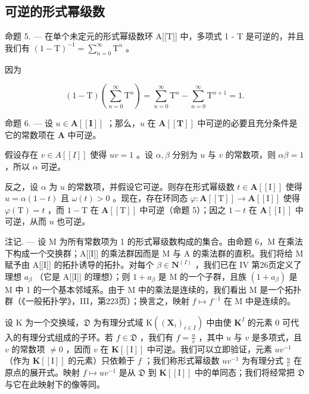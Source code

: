 \subsection{可逆的形式幂级数}

命题 5. --- 在单个未定元的形式幂级数环 A{[}{[}T{]}{]} 中，多项式 1 - T 是可逆的，并且我们有 \((1 - \mathrm{T})^{-1} = \sum_{n=0}^{\infty} \mathrm{T}^{n}\) 。

因为

\[
(1 - \mathrm{T}) \left(\sum_ {n = 0} ^ {\infty} \mathrm{T} ^ {n}\right) = \sum_ {n = 0} ^ {\infty} \mathrm{T} ^ {n} - \sum_ {n = 0} ^ {\infty} \mathrm{T} ^ {n + 1} = 1.
\]

命题 6. --- 设 \(u \in \mathbf{A}[[\mathbf{I}]]\) ；那么，\(u\) 在 \(\mathbf{A}[[\mathbf{T}]]\) 中可逆的必要且充分条件是它的常数项在 \(\mathbf{A}\) 中可逆。

假设存在 \(v \in A[[I]]\) 使得 \(uv = 1\) 。设 \(\alpha, \beta\) 分别为 \(u\) 与 \(v\) 的常数项，则 \(\alpha\beta = 1\) ，所以 \(\alpha\) 可逆。

反之，设 \(\alpha\) 为 \(u\) 的常数项，并假设它可逆。则存在形式幂级数 \(t \in \mathbf{A}[[\mathrm{I}]]\) 使得 \(u = \alpha(1 - t)\) 且 \(\omega(t) > 0\) 。现在，存在环同态 \(\varphi: \mathbf{A}[[\mathrm{T}]] \to \mathbf{A}[[\mathrm{I}]]\) 使得 \(\varphi(\mathrm{T}) = t\) ，而 \(1 - \mathrm{T}\) 在 \(\mathbf{A}[[\mathrm{T}]]\) 中可逆（命题 5）；因之 \(1 - t\) 在 \(\mathbf{A}[[\mathrm{I}]]\) 中可逆，从而 \(u\) 也可逆。

注记. --- 设 M 为所有常数项为 1 的形式幂级数构成的集合。由命题 6，M 在乘法下构成一个交换群；A{[}{[}I{]}{]} 的乘法群因而是 M 与 A 的乘法群的直积。我们将给 M 赋予由 A{[}{[}I{]}{]} 的拓扑诱导的拓扑。对每个 \(\beta \in \mathbf{N}^{(I)}\) ，我们已在 IV 第26页定义了理想 \(a_{\beta}\) （它是 A{[}{[}I{]}{]} 的理想）；则 \(1 + a_{\beta}\) 是 M 的一个子群，且族 \((1 + a_{\beta})\) 是 M 中 1 的一个基本邻域系。由于 M 中的乘法是连续的，我们看出 M 是一个拓扑群（《一般拓扑学》，III，第223页）；换言之，映射 \(f \mapsto f^{-1}\) 在 M 中是连续的。

设 K 为一个交换域，\(\mathfrak{D}\) 为有理分式域 \(\mathrm{K}((\mathbf{X}_i)_{i\in I})\) 中由使 \(\mathbf{K}^I\) 的元素 0 可代入的有理分式组成的子环。若 \(f\in \mathfrak{D}\) ，我们有 \(f = \frac{u}{v}\) ，其中 \(u\) 与 \(v\) 是多项式，且 \(v\) 的常数项 \(\neq 0\) ，因而 \(v\) 在 \(\mathbf{K}[[\mathrm{I}]]\) 中可逆。我们可以立即验证，元素 \(uv^{-1}\) （作为 \(\mathbf{K}[[\mathrm{I}]]\) 的元素）只依赖于 \(f\) ；我们称形式幂级数 \(uv^{-1}\) 为有理分式 \(\frac{u}{v}\) 在原点的展开式。映射 \(f\mapsto uv^{-1}\) 是从 \(\mathfrak{D}\) 到 \(\mathbf{K}[[\mathrm{I}]]\) 中的单同态；我们将经常把 \(\mathfrak{D}\) 与它在此映射下的像等同。


